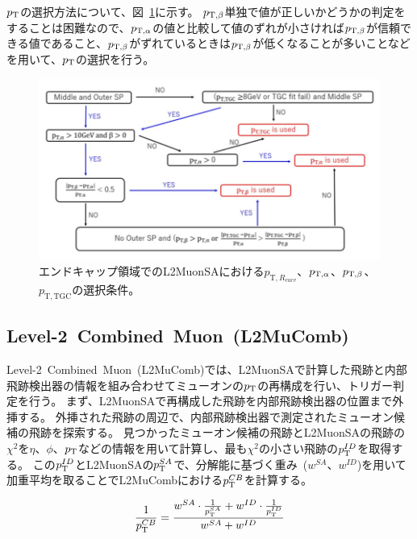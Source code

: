 $p_\mathrm{T}$の選択方法について、図~\ref{fig:3-11}に示す。
$p_{\mathrm{T}, \beta}$単独で値が正しいかどうかの判定をすることは困難なので、$p_{\mathrm{T}, \alpha}$の値と比較して値のずれが小さければ$p_{\mathrm{T}, \beta}$が信頼できる値であること、$p_{\mathrm{T}, \beta}$がずれているときは$p_{\mathrm{T}, \beta}$が低くなることが多いことなどを用いて、$p_\mathrm{T}$の選択を行う。

\begin{figure}[h]
  \centering
  \includegraphics[clip, width=14cm]{fig/3/l2muonSA_pTselection.png}
  \caption{エンドキャップ領域でのL2MuonSAにおける$p_{\mathrm{T},R_{curv}}$、$p_{\mathrm{T}, \alpha}$、$p_{\mathrm{T}, \beta}$、$p_{\mathrm{T,TGC}}$の選択条件\cite{article:wakamiya}。}
  \label{fig:3-11}
\end{figure}



\subsection{Level-2~Combined~Muon~(L2MuComb)}\label{chapter3-2-3}
Level-2~Combined~Muon~(L2MuComb)では、L2MuonSAで計算した飛跡と内部飛跡検出器の情報を組み合わせてミューオンの$p_\mathrm{T}$の再構成を行い、トリガー判定を行う。
まず、L2MuonSAで再構成した飛跡を内部飛跡検出器の位置まで外挿する。
外挿された飛跡の周辺で、内部飛跡検出器で測定されたミューオン候補の飛跡を探索する。
見つかったミューオン候補の飛跡とL2MuonSAの飛跡の$\chi^2$を$\eta$、$\phi$、$p_\mathrm{T}$などの情報を用いて計算し、最も$\chi^2$の小さい飛跡の$p_\mathrm{T}^{ID}$を取得する。
この$p_\mathrm{T}^{ID}$とL2MuonSAの$p_\mathrm{T}^{SA}$で、分解能に基づく重み~($w^{SA}$、$w^{ID}$)を用いて加重平均を取ることでL2MuCombにおける$p_\mathrm{T}^{CB}$を計算する。

\begin{equation}
    \frac{1}{p_\mathrm{T}^{C B}}=\frac{w^{S A} \cdot \frac{1}{p_\mathrm{T}^{S A}}+w^{I D} \cdot \frac{1}{p_\mathrm{T}^{I D}}}{w^{S A}+w^{I D}}
\end{equation}

